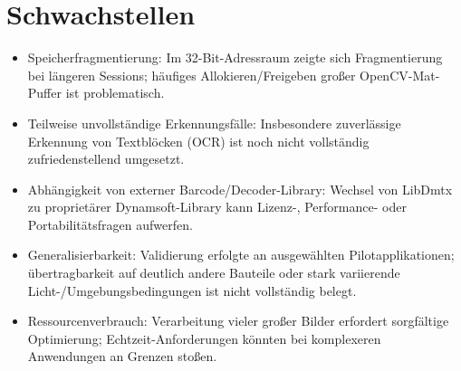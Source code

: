 \documentclass[a4paper,11pt]{article}
\begin{document}
  \section*{Schwachstellen}
  \begin{itemize}
  \item Speicherfragmentierung: Im 32-Bit-Adressraum zeigte sich
    Fragmentierung bei längeren Sessions; häufiges
    Allokieren/Freigeben großer OpenCV-Mat-Puffer ist problematisch.
  \item Teilweise unvollständige Erkennungsfälle: Insbesondere
    zuverlässige Erkennung von Textblöcken (OCR) ist noch nicht
    vollständig zufriedenstellend umgesetzt.
  \item Abhängigkeit von externer Barcode/Decoder-Library: Wechsel von
    LibDmtx zu proprietärer Dynamsoft-Library kann Lizenz-,
    Performance- oder Portabilitätsfragen aufwerfen.
  \item Generalisierbarkeit: Validierung erfolgte an ausgewählten
    Pilotapplikationen; übertragbarkeit auf deutlich andere Bauteile
    oder stark variierende Licht-/Umgebungsbedingungen ist nicht
    vollständig belegt.
  \item Ressourcenverbrauch: Verarbeitung vieler großer Bilder
    erfordert sorgfältige Optimierung; Echtzeit-Anforderungen könnten
    bei komplexeren Anwendungen an Grenzen stoßen.
  \end{itemize}
\end{document}
